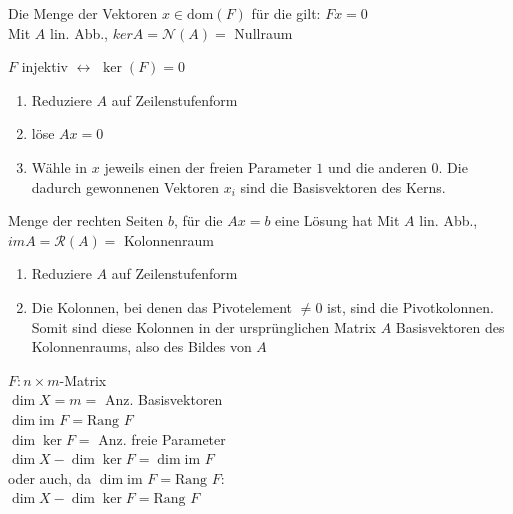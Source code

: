\documentclass[a4paper,twocolumn]{article}
\begin{document}
		\begin{fdef}[Kern]
			Die Menge der Vektoren $x \in \text{dom}(F)$ für die gilt: $Fx = 0$\\
			Mit $A$ lin. Abb., $ker A = \mathcal{N}(A) = $ Nullraum
		\end{fdef}
			\vspace{-3mm}
			$F$ injektiv $\leftrightarrow$ $\ker(F) = 0$
		
		\begin{fmerke}
			\begin{enumerate}
				\item Reduziere $A$ auf Zeilenstufenform
				\item löse $Ax = 0$
				\item Wähle in $x$ jeweils einen der freien Parameter $1$ und die anderen $0$. Die dadurch gewonnenen Vektoren $x_i$ sind die Basisvektoren des Kerns.
			\end{enumerate}
			\vspace{-3mm}
		\end{fmerke}
			
		\begin{fdef}[Bild]
			Menge der rechten Seiten $b$, für die $Ax=b$ eine Lösung hat 
			Mit $A$ lin. Abb., $im A = \mathcal{R}(A) = $ Kolonnenraum
		\end{fdef}

		\begin{fmerke}
			\begin{enumerate}
				\item Reduziere $A$ auf Zeilenstufenform
				\item Die Kolonnen, bei denen das Pivotelement $\ne 0$ ist, sind die Pivotkolonnen.
						Somit sind diese Kolonnen in der ursprünglichen Matrix $A$ Basisvektoren des
						Kolonnenraums, also des Bildes von $A$
			\end{enumerate}
			\vspace{-3mm}
		\end{fmerke}
		
		\begin{fsatz}[Dimensionsformel]
			$F : n \times m$-Matrix\\
			$\dim X = m = $ Anz. Basisvektoren \\
			$\dim \text{im } F = \text{Rang } F$ \\
			$\dim \ker F = $ Anz. freie Parameter\\[2mm]
			$\dim X - \dim \ker F = \dim \text{im } F$\\[2mm]
			oder auch, da $\dim \text{im } F = \text{Rang } F:$\\[1mm]
			\underline{$\dim X - \dim \ker F = \text{Rang } F$}
		\end{fsatz}
		
\end{document}

